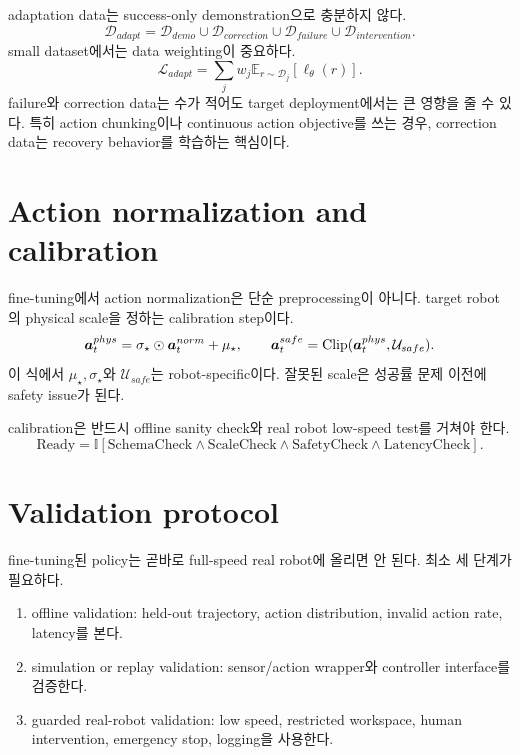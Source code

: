 adaptation data는 success-only demonstration으로 충분하지 않다.
\begin{equation}
  \mathcal{D}_{adapt}
  =
  \mathcal{D}_{demo}
  \cup
  \mathcal{D}_{correction}
  \cup
  \mathcal{D}_{failure}
  \cup
  \mathcal{D}_{intervention}.
  \label{eq:ch15-adaptation-data}
\end{equation}
small dataset에서는 data weighting이 중요하다.
\begin{equation}
  \mathcal{L}_{adapt}
  =
  \sum_{j}
  w_j
  \mathbb{E}_{r\sim\mathcal{D}_j}
  [
  \ell_{\theta}(r)
  ].
  \label{eq:ch15-adaptation-mixture}
\end{equation}
failure와 correction data는 수가 적어도 target deployment에서는 큰 영향을 줄 수 있다. 특히 action chunking이나 continuous action objective를 쓰는 경우, correction data는 recovery behavior를 학습하는 핵심이다.

\section{Action normalization and calibration}

fine-tuning에서 action normalization은 단순 preprocessing이 아니다. target robot의 physical scale을 정하는 calibration step이다.
\begin{equation}
  \bm{a}_t^{phys}
  =
  \sigma_{\star}
  \odot
  \bm{a}_t^{norm}
  +
  \mu_{\star},
  \qquad
  \bm{a}_t^{safe}
  =
  \mathrm{Clip}
  (\bm{a}_t^{phys},\mathcal{U}_{safe}).
  \label{eq:ch15-action-calibration}
\end{equation}
이 식에서 $\mu_{\star},\sigma_{\star}$와 $\mathcal{U}_{safe}$는 robot-specific이다. 잘못된 scale은 성공률 문제 이전에 safety issue가 된다.

calibration은 반드시 offline sanity check와 real robot low-speed test를 거쳐야 한다.
\begin{equation}
  \mathrm{Ready}
  =
  \mathbb{I}
  [
  \mathrm{SchemaCheck}
  \land
  \mathrm{ScaleCheck}
  \land
  \mathrm{SafetyCheck}
  \land
  \mathrm{LatencyCheck}
  ].
  \label{eq:ch15-readiness}
\end{equation}

\section{Validation protocol}

fine-tuning된 policy는 곧바로 full-speed real robot에 올리면 안 된다. 최소 세 단계가 필요하다.
\begin{enumerate}
  \item offline validation: held-out trajectory, action distribution, invalid action rate, latency를 본다.
  \item simulation or replay validation: sensor/action wrapper와 controller interface를 검증한다.
  \item guarded real-robot validation: low speed, restricted workspace, human intervention, emergency stop, logging을 사용한다.
\end{enumerate}

